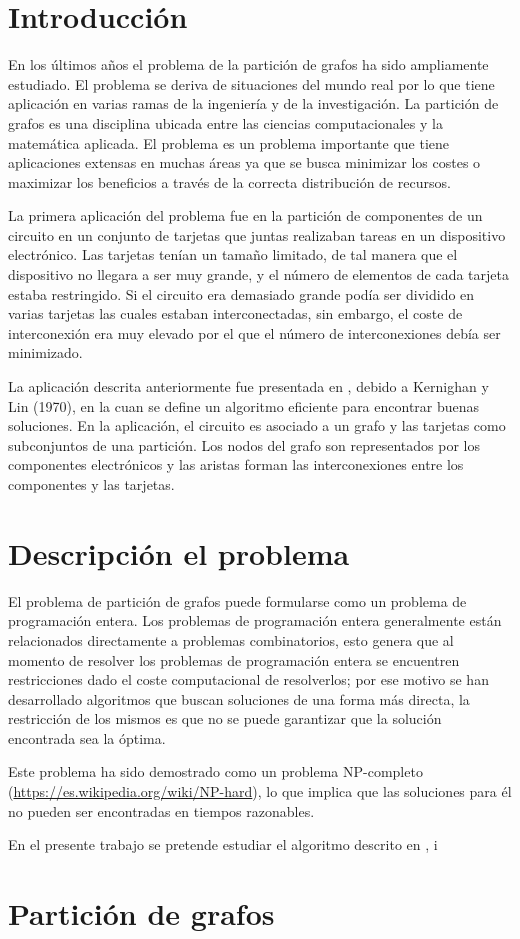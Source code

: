 \section{Introducción}
En los últimos años el problema de la partición de grafos ha sido ampliamente estudiado. El problema se deriva de situaciones del mundo real por lo que tiene aplicación en varias ramas de la ingeniería y de la investigación. La partición de grafos es una disciplina ubicada entre las ciencias computacionales y la matemática aplicada. El problema es un problema importante que tiene aplicaciones extensas en muchas áreas ya que se busca minimizar los costes o maximizar los beneficios a través de la correcta distribución de recursos. 

La primera aplicación del problema fue en la partición de componentes de un circuito en un conjunto de tarjetas que juntas realizaban tareas en un dispositivo electrónico. Las tarjetas tenían un tamaño limitado, de tal manera que el dispositivo no llegara a ser muy grande, y el número de elementos de cada tarjeta estaba restringido. Si el circuito era demasiado grande podía ser dividido en varias tarjetas las cuales estaban interconectadas, sin embargo, el coste de interconexión era muy elevado por el que el número de interconexiones debía ser minimizado.

La aplicación descrita anteriormente fue presentada en \cite{KernighanLin}, debido a Kernighan y Lin (1970), en la cuan se define un algoritmo eficiente para encontrar buenas soluciones. En la aplicación, el circuito es asociado a un grafo y las tarjetas como subconjuntos de una partición. Los nodos del grafo son representados por los componentes electrónicos y las aristas forman las interconexiones entre los componentes y las tarjetas.

\section{Descripción el problema}
El problema de partición de grafos puede formularse como un problema de programación entera. Los problemas de programación entera generalmente están relacionados directamente a problemas combinatorios, esto genera que al momento de resolver los problemas de programación entera se encuentren restricciones dado el coste computacional de resolverlos; por ese motivo se han desarrollado algoritmos que buscan soluciones de una forma más directa, la restricción de los mismos es que no se puede garantizar que la solución encontrada sea la óptima. 

Este problema ha sido demostrado como un problema NP-completo (\url{https://es.wikipedia.org/wiki/NP-hard}), lo que implica que las soluciones para él no pueden ser encontradas en tiempos razonables.

En el presente trabajo se pretende estudiar el algoritmo descrito en \cite{KernighanLin}, \cite{FiducciaMattheyses} i 

\section{Partición de grafos}